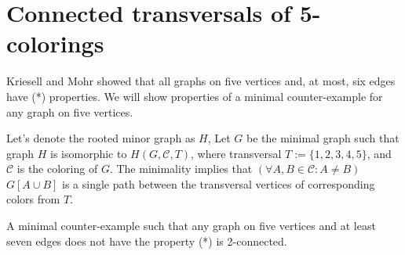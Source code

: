 \chapter{Connected transversals of 5-colorings}
Kriesell and Mohr \cite{matthias_2022} showed that all graphs on five vertices and, at most, six edges have (*) properties. 
We will show properties of a minimal counter-example for any graph on five vertices.

Let's denote the rooted minor graph as $H$, Let $G$ be the minimal graph such that graph $H$ is isomorphic to $H(G, \mathcal{C}, T)$, where transversal $T := \{1, 2, 3, 4, 5\}$, and $\mathcal{C}$ is the coloring of $G$.
 The minimality implies that $(\forall A, B \in \mathcal{C}: A \neq B)$ $G[A \cup B]$ is a single path between the transversal vertices of corresponding colors from $T$.

\begin{lemma}
    A minimal counter-example such that any graph on five vertices and at least seven edges does not have the property (*) is 2-connected.
\end{lemma}

